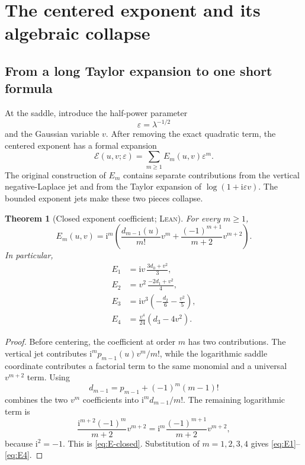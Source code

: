 \documentclass[11pt,oneside]{article}
\newtheorem{theorem}{Theorem}[section]
\theoremstyle{definition}
\theoremstyle{remark}
\newcommand{\ii}{\mathrm i}
\newcommand{\Formalized}{\textsc{Lean}}
\begin{document}
\section{The centered exponent and its algebraic collapse}
\label{sec:centered-exponent}

\subsection{From a long Taylor expansion to one short formula}

At the saddle, introduce the half-power parameter
\[
 \varepsilon=\lambda^{-1/2}
\]
and the Gaussian variable $v$.  After removing the exact quadratic term,
the centered exponent has a formal expansion
\[
 \mathcal E(u,v;\varepsilon)
 =\sum_{m\geq1}E_m(u,v)\varepsilon^m.
\]
The original construction of $E_m$ contains separate contributions from
the vertical negative-Laplace jet and from the Taylor expansion of
$\log(1+\ii\varepsilon v)$.  The bounded exponent jets make these two
pieces collapse.

\begin{theorem}[Closed exponent coefficient; \Formalized]
\label{thm:closed-exponent}
For every $m\geq1$,
\begin{equation}
 E_m(u,v)=\ii^m\left(
   \frac{d_{m-1}(u)}{m!}v^m
   +\frac{(-1)^{m+1}}{m+2}v^{m+2}
 \right). \label{eq:E-closed}
\end{equation}
In particular,
\begin{align}
 E_1&=\ii v\,\frac{3d_0+v^2}{3}, \label{eq:E1}\\
 E_2&=v^2\,\frac{-2d_1+v^2}{4}, \label{eq:E2}\\
 E_3&=\ii v^3\left(-\frac{d_2}{6}-\frac{v^2}{5}\right), \label{eq:E3}\\
 E_4&=\frac{v^4}{24}(d_3-4v^2). \label{eq:E4}
\end{align}
\end{theorem}

\begin{proof}
Before centering, the coefficient at order $m$ has two contributions.
The vertical jet contributes $\ii^m p_{m-1}(u)v^m/m!$, while the
logarithmic saddle coordinate contributes a factorial term to the same
monomial and a universal $v^{m+2}$ term.  Using
\[
 d_{m-1}=p_{m-1}+(-1)^m(m-1)!
\]
combines the two $v^m$ coefficients into
$\ii^m d_{m-1}/m!$.  The remaining logarithmic term is
\[
 \frac{\ii^{m+2}(-1)^m}{m+2}v^{m+2}
 =\ii^m\frac{(-1)^{m+1}}{m+2}v^{m+2},
\]
because $\ii^2=-1$.  This is \eqref{eq:E-closed}.  Substitution of
$m=1,2,3,4$ gives \eqref{eq:E1}--\eqref{eq:E4}.
\end{proof}
\end{document}
